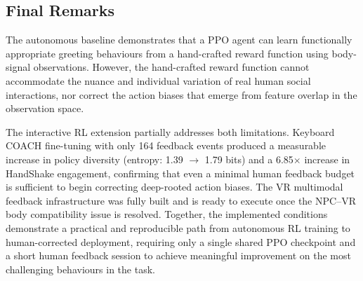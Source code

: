 \documentclass[../report.tex]{subfiles}
\begin{document}
    \subsection{Final Remarks}

    The autonomous baseline demonstrates that a PPO agent can learn functionally appropriate greeting behaviours from a hand-crafted reward function using body-signal observations. However, the hand-crafted reward function cannot accommodate the nuance and individual variation of real human social interactions, nor correct the action biases that emerge from feature overlap in the observation space.

    The interactive RL extension partially addresses both limitations. Keyboard COACH fine-tuning with only 164 feedback events produced a measurable increase in policy diversity (entropy: 1.39 $\to$ 1.79 bits) and a 6.85$\times$ increase in HandShake engagement, confirming that even a minimal human feedback budget is sufficient to begin correcting deep-rooted action biases. The VR multimodal feedback infrastructure was fully built and is ready to execute once the NPC--VR body compatibility issue is resolved. Together, the implemented conditions demonstrate a practical and reproducible path from autonomous RL training to human-corrected deployment, requiring only a single shared PPO checkpoint and a short human feedback session to achieve meaningful improvement on the most challenging behaviours in the task.
\end{document}
